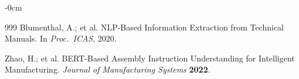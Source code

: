 \documentclass[applsci,article,submit,pdftex,moreauthors]{Definitions/mdpi}
\begin{document}
\begin{adjustwidth}{-\extralength}{0cm}
{\begin{thebibliography}{999}
Blumenthal, A.; et al. NLP-Based Information Extraction from Technical Manuals. In {\em Proc.\ ICAS}, 2020.

Zhao, H.; et al. BERT-Based Assembly Instruction Understanding for Intelligent Manufacturing. {\em Journal of Manufacturing Systems} {\bf 2022}.

\end{thebibliography}
}

\PublishersNote{}
\end{adjustwidth}
\end{document}
